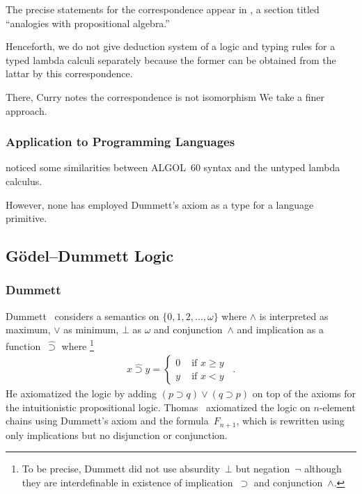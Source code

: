 The
precise statements for the correspondence appear in
\citet[9E]{curry1974combinatory}, a section titled ``analogies with
propositional algebra.''

 Henceforth, we do not give deduction system of a logic and
 typing rules for a typed lambda calculi separately because
 the former can be obtained from the lattar by this correspondence.

There, Curry notes the correspondence is not isomorphism  We take a finer approach.

\subsubsection{Application to Programming Languages}

\citet{landin1965} noticed some similarities between ALGOL~60 syntax and
the untyped lambda calculus.

However, none has employed Dummett's axiom as a type for a language primitive.

\subsection{G\"odel--Dummett Logic}
\subsubsection{Dummett}
Dummett~\cite{dummett59} considers a semantics on $\{0,1,2,\ldots,\omega\}$ where
$\wedge$ is interpreted as maximum, $\vee$ as minimum, $\bot$ as $\omega$
and conjunction~$\wedge$
 and implication as a
function~$\hat\supset$ where%
\footnote{To be precise, Dummett did not use absurdity~$\bot$ but negation~$\neg$
although they are interdefinable in existence of implication~$\supset$
and conjunction~$\wedge$.}
\begin{align*}
 x \hat\supset y= \begin{cases}
		    0 &\text{ if } x\ge y \\
		    y &\text{ if } x < y
		  \end{cases}\enspace.
\end{align*}
He axiomatized the logic by adding $(p\supset q)\lor(q\supset p)$ on top
of the axioms for the intuitionistic propositional logic.
Thomas~\citep{thomas1962} axiomatized
 the logic on $n$-element chains using Dummett's axiom and the
 formula~$F_{n+1}$,
 which is rewritten using only implications but no disjunction or conjunction.

